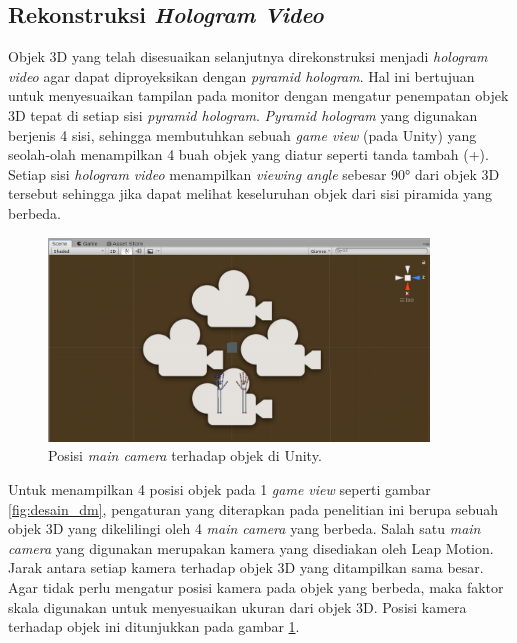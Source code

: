 	\subsection{Rekonstruksi \textit{Hologram Video}} \label{section:rekonstruksi}
	\vspace{1ex}
		Objek 3D yang telah disesuaikan selanjutnya direkonstruksi menjadi \textit{hologram video} agar dapat diproyeksikan dengan \textit{pyramid hologram}. Hal ini bertujuan untuk menyesuaikan tampilan pada monitor dengan mengatur penempatan objek 3D tepat di setiap sisi \textit{pyramid hologram}. \textit{Pyramid hologram} yang digunakan berjenis 4 sisi, sehingga membutuhkan sebuah \textit{game view} (pada Unity) yang seolah-olah menampilkan 4 buah objek yang diatur seperti tanda tambah (+). Setiap sisi \textit{hologram video} menampilkan \textit{viewing angle} sebesar 90° dari objek 3D tersebut sehingga jika dapat melihat keseluruhan objek dari sisi piramida yang berbeda.
		\begin{figure} [H]
			\includegraphics[width=0.9\textwidth]{img/bab3/unity_4cam.png}
			\caption{Posisi \textit{main camera} terhadap objek di Unity.}
			\label{fig:unity_4cam}
		\end{figure}
		\vspace{-2ex}
		
		Untuk menampilkan 4 posisi objek pada 1 \textit{game view} seperti gambar \ref{fig:desain_dm}, pengaturan yang diterapkan pada penelitian ini berupa sebuah objek 3D yang dikelilingi oleh 4 \textit{main camera} yang berbeda. Salah satu \textit{main camera} yang digunakan merupakan kamera yang disediakan oleh Leap Motion. Jarak antara setiap kamera terhadap objek 3D yang ditampilkan sama besar. Agar tidak perlu mengatur posisi kamera pada objek yang berbeda, maka faktor skala digunakan untuk menyesuaikan ukuran dari objek 3D. Posisi kamera terhadap objek ini ditunjukkan pada gambar \ref{fig:unity_4cam}.
		

